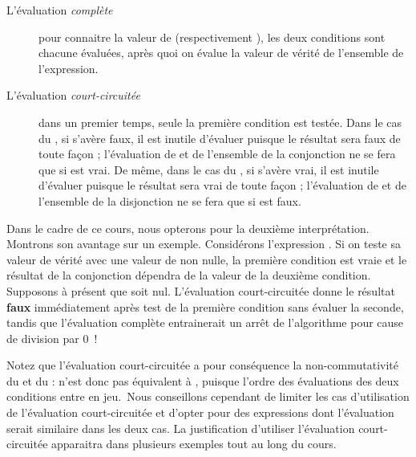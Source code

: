 		\begin{description}
		\item[L’évaluation \textit{complète}]
			pour connaitre la valeur de
			 (respectivement
			), les deux conditions sont chacune
			évaluées, après quoi on évalue la valeur de vérité de l’ensemble de
			l’expression.
		\item[L’évaluation \textit{court-circuitée}]
			dans un premier temps, seule la
			première condition est testée. Dans le cas du ,
			si  s’avère faux, il est inutile d’évaluer
			 puisque le résultat sera faux de toute façon
			; l’évaluation de  et de l’ensemble de la
			conjonction ne se fera que si  est vrai. De
			même, dans le cas du , si
			 s’avère vrai, il est inutile d’évaluer
			 puisque le résultat sera vrai de toute façon
			; l’évaluation de  et de l’ensemble de la
			disjonction ne se fera que si  est faux.
		\end{description}

		Dans le cadre de ce cours, nous opterons pour la deuxième 
		interprétation.
		Montrons son avantage sur un exemple.
		Considérons	l’expression 
		\pseudocode{${\neq}$}. Si on teste sa valeur de vérité avec une
		valeur de  non nulle, la première condition est
		vraie et le résultat de la conjonction dépendra de la valeur de la
		deuxième condition. Supposons à présent que  soit
		nul. L’évaluation court-circuitée donne le résultat \textbf{faux}
		immédiatement après test de la première condition sans évaluer la
		seconde, tandis que l’évaluation complète entrainerait un arrêt de
		l’algorithme pour cause de division par 0~!

		Notez que l’évaluation court-circuitée a pour conséquence la
		non-commutativité du  et du
		:  n’est donc
		pas équivalent à , puisque l’ordre
		des évaluations des deux conditions entre en jeu.~Nous conseillons
		cependant de limiter les cas d’utilisation de l’évaluation
		court-circuitée et d’opter pour des expressions dont
		l’évaluation serait similaire dans les deux cas. La justification
		d’utiliser l’évaluation court-circuitée apparaitra dans plusieurs
		exemples tout au long du cours.
	
